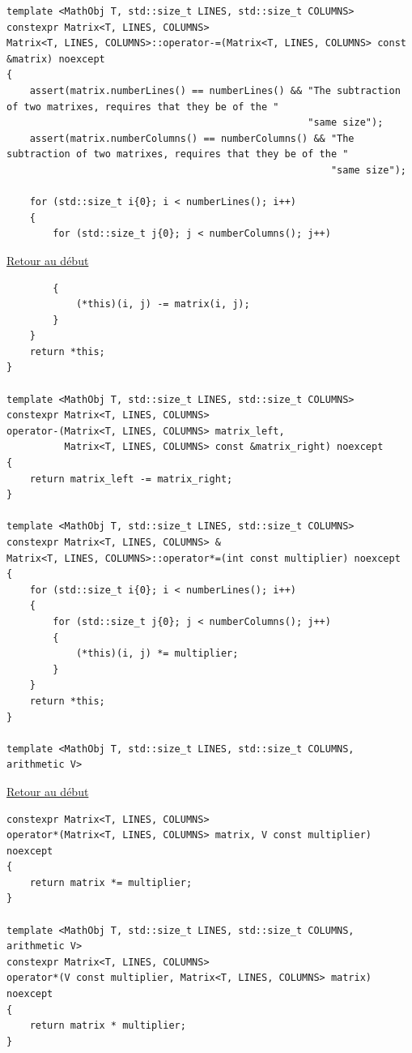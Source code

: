 {\begin{frame}[fragile]
\begin{verbatim}
template <MathObj T, std::size_t LINES, std::size_t COLUMNS>
constexpr Matrix<T, LINES, COLUMNS>
Matrix<T, LINES, COLUMNS>::operator-=(Matrix<T, LINES, COLUMNS> const &matrix) noexcept
{
	assert(matrix.numberLines() == numberLines() && "The subtraction of two matrixes, requires that they be of the "
													"same size");
	assert(matrix.numberColumns() == numberColumns() && "The subtraction of two matrixes, requires that they be of the "
														"same size");

	for (std::size_t i{0}; i < numberLines(); i++)
	{
		for (std::size_t j{0}; j < numberColumns(); j++)
\end{verbatim}
\end{frame}

\begin{frame}[fragile]
\hyperlink{conclusion}{Retour au début}\newline
\begin{verbatim}
		{
			(*this)(i, j) -= matrix(i, j);
		}
	}
	return *this;
}

template <MathObj T, std::size_t LINES, std::size_t COLUMNS>
constexpr Matrix<T, LINES, COLUMNS>
operator-(Matrix<T, LINES, COLUMNS> matrix_left,
		  Matrix<T, LINES, COLUMNS> const &matrix_right) noexcept
{
	return matrix_left -= matrix_right;
}

template <MathObj T, std::size_t LINES, std::size_t COLUMNS>
constexpr Matrix<T, LINES, COLUMNS> &
Matrix<T, LINES, COLUMNS>::operator*=(int const multiplier) noexcept
{
	for (std::size_t i{0}; i < numberLines(); i++)
	{
		for (std::size_t j{0}; j < numberColumns(); j++)
		{
			(*this)(i, j) *= multiplier;
		}
	}
	return *this;
}

template <MathObj T, std::size_t LINES, std::size_t COLUMNS, arithmetic V>
\end{verbatim}
\end{frame}

\begin{frame}[fragile]
\hyperlink{conclusion}{Retour au début}\newline
\begin{verbatim}
constexpr Matrix<T, LINES, COLUMNS>
operator*(Matrix<T, LINES, COLUMNS> matrix, V const multiplier) noexcept
{
	return matrix *= multiplier;
}

template <MathObj T, std::size_t LINES, std::size_t COLUMNS, arithmetic V>
constexpr Matrix<T, LINES, COLUMNS>
operator*(V const multiplier, Matrix<T, LINES, COLUMNS> matrix) noexcept
{
	return matrix * multiplier;
}


\end{verbatim}
\end{frame}}
